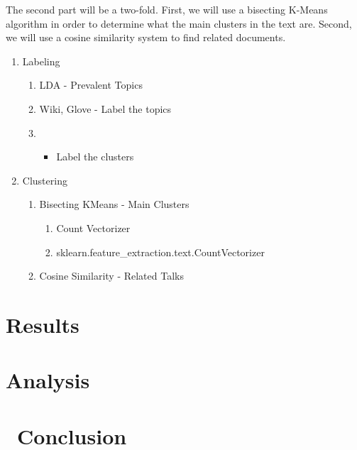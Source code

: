 \documentclass[11pt]{article}
\providecommand{\tightlist}{%
      \setlength{\itemsep}{0pt}\setlength{\parskip}{0pt}}
\begin{document}
The second part will be a two-fold. First, we will use a bisecting
K-Means algorithm in order to determine what the main clusters in the
text are. Second, we will use a cosine similarity system to find related
documents.

\begin{enumerate}
\def\labelenumi{\arabic{enumi}.}
\tightlist
\item
  Labeling

  \begin{enumerate}
  \def\labelenumii{\arabic{enumii}.}
  \setcounter{enumii}{1}
  \item
    LDA - Prevalent Topics
  \item
    Wiki, Glove - Label the topics
  \item
    \begin{itemize}
    \tightlist
    \item
      Label the clusters
    \end{itemize}
  \end{enumerate}
\item
  Clustering

  \begin{enumerate}
  \def\labelenumii{\arabic{enumii}.}
  \setcounter{enumii}{1}
  \tightlist
  \item
    Bisecting KMeans - Main Clusters

    \begin{enumerate}
    \def\labelenumiii{\arabic{enumiii}.}
    \setcounter{enumiii}{2}
    \tightlist
    \item
      Count Vectorizer
    \item
      sklearn.feature\_extraction.text.CountVectorizer
    \end{enumerate}
  \item
    Cosine Similarity - Related Talks
  \end{enumerate}
\end{enumerate}

    \section{Results}\label{results}

    \section{Analysis}\label{analysis}

    \section{~Conclusion}\label{conclusion}


    
    
    
    
\end{document}
